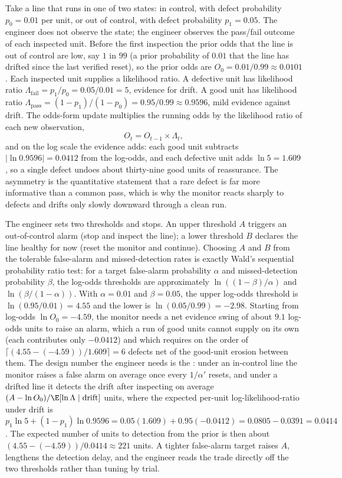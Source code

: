 Take a line that runs in one of two states: in control, with defect
probability $p_{0} = 0.01$ per unit, or out of control, with defect
probability $p_{1} = 0.05$. The engineer does not observe the state; the
engineer observes the pass/fail outcome of each inspected unit. Before
the first inspection the prior odds that the line is out of control are
low, say $1$ in $99$ (a prior probability of $0.01$ that the line has
drifted since the last verified reset), so the prior odds are $O_{0} =
0.01/0.99 \approx 0.0101$. Each inspected unit supplies a likelihood
ratio. A defective unit has likelihood ratio $\Lambda_{\text{fail}} =
p_{1}/p_{0} = 0.05/0.01 = 5$, evidence for drift. A good unit has
likelihood ratio $\Lambda_{\text{pass}} = (1 - p_{1})/(1 - p_{0}) =
0.95/0.99 \approx 0.9596$, mild evidence against drift. The odds-form
update multiplies the running odds by the likelihood ratio of each new
observation,
\[
O_{t} = O_{t-1} \times \Lambda_{t},
\]
and on the log scale the evidence adds: each good unit subtracts
$|\ln 0.9596| = 0.0412$ from the log-odds, and each defective unit adds
$\ln 5 = 1.609$, so a single defect undoes about thirty-nine good units
of reassurance. The asymmetry is the quantitative statement that a rare
defect is far more informative than a common pass, which is why the
monitor reacts sharply to defects and drifts only slowly downward through
a clean run.

The engineer sets two thresholds and stops. An upper threshold $A$
triggers an out-of-control alarm (stop and inspect the line); a lower
threshold $B$ declares the line healthy for now (reset the monitor and
continue). Choosing $A$ and $B$ from the tolerable false-alarm and
missed-detection rates is exactly Wald's sequential probability ratio
test: for a target false-alarm probability $\alpha$ and missed-detection
probability $\beta$, the log-odds thresholds are approximately $\ln((1 -
\beta)/\alpha)$ and $\ln(\beta/(1 - \alpha))$. With $\alpha = 0.01$ and
$\beta = 0.05$, the upper log-odds threshold is $\ln(0.95/0.01) = 4.55$
and the lower is $\ln(0.05/0.99) = -2.98$. Starting from log-odds
$\ln O_{0} = -4.59$, the monitor needs a net evidence swing of about
$9.1$ log-odds units to raise an alarm, which a run of good units cannot
supply on its own (each contributes only $-0.0412$) and which requires on
the order of $\lceil (4.55 - (-4.59))/1.609 \rceil = 6$ defects net of
the good-unit erosion between them. The design number the engineer needs
is the : under an in-control line the monitor
raises a false alarm on average once every $1/\alpha' $ resets, and under
a drifted line it detects the drift after inspecting on average
$(A - \ln O_{0})/\E[\ln \Lambda \mid \text{drift}]$ units, where the
expected per-unit log-likelihood-ratio under drift is $p_{1}\ln 5 + (1 -
p_{1})\ln 0.9596 = 0.05(1.609) + 0.95(-0.0412) = 0.0805 - 0.0391 =
0.0414$. The expected number of units to detection from the prior is then
about $(4.55 - (-4.59))/0.0414 \approx 221$ units. A tighter false-alarm
target raises $A$, lengthens the detection delay, and the engineer reads
the trade directly off the two thresholds rather than tuning by trial.

